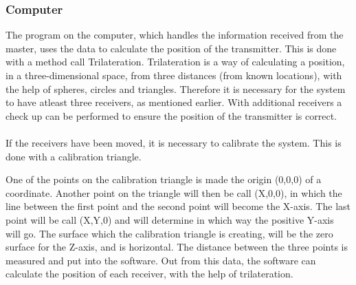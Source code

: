 \subsubsection{Computer}
The program on the computer, which handles the information received from the master, uses the data to calculate the position of the transmitter. This is done with a method call Trilateration. Trilateration is a way of calculating a position, in a three-dimensional space, from three distances (from known locations), with the help of spheres, circles and triangles. Therefore it is necessary for the system to have atleast three receivers, as mentioned earlier. With additional receivers a check up can be performed to ensure the position of the transmitter is correct.\\\\

If the receivers have been moved, it is necessary to calibrate the system. This is done with a calibration triangle.



 One of the points on the calibration triangle is made the origin (0,0,0) of a coordinate. Another point on the triangle will then be call (X,0,0), in which the line between the first point and the second point will become the X-axis. The last point will be call (X,Y,0) and will determine in which way the positive Y-axis will go. The surface which the calibration triangle is creating, will be the zero surface for the Z-axis, and is horizontal. The distance between the three points is measured and put into the software. Out from this data, the software can calculate the position of each receiver, with the help of trilateration. \\\\